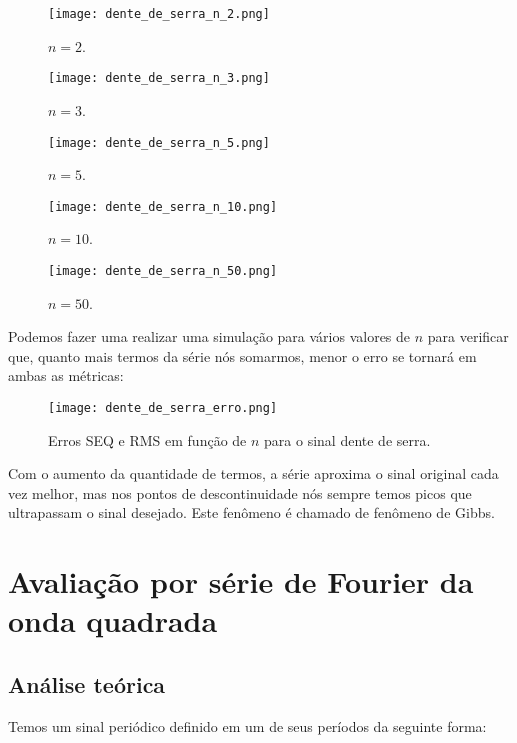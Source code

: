\documentclass[10pt,twocolumn]{article}
\newcommand{\?}{\stackrel{?}{=}}
\begin{document}
\begin{figure}[h!]
	\texttt{[image: dente\_de\_serra\_n\_2.png]}
	\centering
	\caption{$n=2$.}
\end{figure}

\begin{figure}[h!]
	\texttt{[image: dente\_de\_serra\_n\_3.png]}
	\centering
	\caption{$n=3$.}
\end{figure}

\begin{figure}[h!]
	\texttt{[image: dente\_de\_serra\_n\_5.png]}
	\centering
	\caption{$n=5$.}
\end{figure}

\begin{figure}[h!]
	\texttt{[image: dente\_de\_serra\_n\_10.png]}
	\centering
	\caption{$n=10$.}
\end{figure}

\begin{figure}[h!]
	\texttt{[image: dente\_de\_serra\_n\_50.png]}
	\centering
	\caption{$n=50$.}
\end{figure}

\FloatBarrier
\pagebreak
Podemos fazer uma realizar uma simulação para vários valores de $n$ para verificar que, quanto mais termos da série nós somarmos, menor o erro se tornará em ambas as métricas:

\begin{figure}[h!]
	\texttt{[image: dente\_de\_serra\_erro.png]}
	\centering
	\caption{Erros SEQ e RMS em função de $n$ para o sinal dente de serra.}
\end{figure}
\FloatBarrier

Com o aumento da quantidade de termos, a série aproxima o sinal original cada vez melhor, mas nos pontos de descontinuidade nós sempre temos picos que ultrapassam o sinal desejado. Este fenômeno é chamado de fenômeno de Gibbs.

\section{Avaliação por série de Fourier da onda quadrada}

\subsection{Análise teórica}

Temos um sinal periódico definido em um de seus períodos da seguinte forma:
\end{document}
